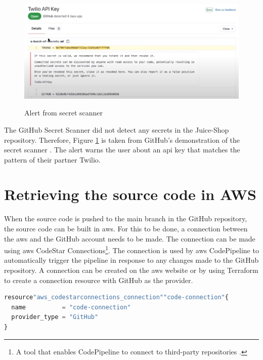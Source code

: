\vspace{2mm}
\begin{figure}[H]
    \centering
    \includegraphics[width=0.8\columnwidth]{Images/secretscanneralert.png}
    \caption{Alert from secret scanner} \cite{GitHubVideo}
    \label{fig: Alert from secret scanner}
\end{figure}

The GitHub Secret Scanner did not detect any secrets in the Juice-Shop repository. Therefore, Figure \ref{fig: Alert from secret scanner} is taken from GitHub's demonstration of the secret scanner \cite{GitHubVideo}. The alert warns the user about an \acrshort{api} key that matches the pattern of their partner Twilio. 

\section{Retrieving the source code in AWS}
When the source code is pushed to the main branch in the GitHub repository, the source code can be built in \acrshort{aws}. For this to be done, a connection between the \acrshort{aws} and the GitHub account needs to be made. The connection can be made using \acrshort{aws} CodeStar Connections\footnote{A tool that enables CodePipeline to connect to third-party repositories \cite{CodeStarConnections}.}. The connection is used by \acrshort{aws} CodePipeline to automatically trigger the \gls{pipeline} in response to any changes made to the GitHub repository. A connection can be created on the \acrshort{aws} website or by using Terraform to create a connection resource with GitHub as the provider.

\vspace{2mm}
\begin{lstlisting}[language=terraform, caption=Creation of a connection between AWS and GitHub, captionpos=b, frame=single]
resource"aws_codestarconnections_connection""code-connection"{
  name          = "code-connection"
  provider_type = "GitHub" 
}
\end{lstlisting}

